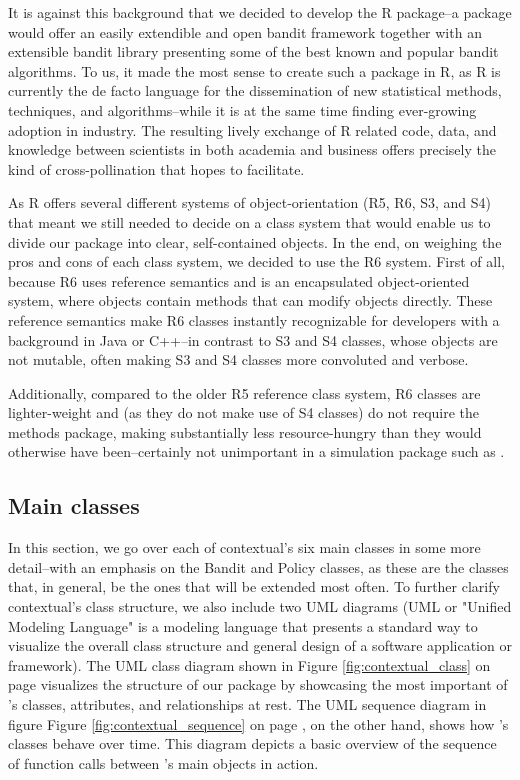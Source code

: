 \documentclass[nojss]{jss}\usepackage[]{graphicx}\usepackage[]{color}
\begin{document}
It is against this background that we decided to develop the  R package--a package would offer an easily extendible and open bandit framework together with an extensible bandit library presenting some of the best known and popular bandit algorithms. To us, it made the most sense to create such a package in R, as R is currently the de facto language for the dissemination of new statistical methods, techniques, and algorithms--while it is at the same time finding ever-growing adoption in industry. The resulting lively exchange of R related code, data, and knowledge between scientists in both academia and business offers precisely the kind of cross-pollination that  hopes to facilitate.

As R offers several different systems of object-orientation (R5, R6, S3, and S4) that meant we still needed to decide on a class system that would enable us to divide our package into clear, self-contained objects. In the end, on weighing the pros and cons of each class system, we decided to use the R6 system. First of all, because R6 uses reference semantics and is an encapsulated object-oriented system, where objects contain methods that can modify objects directly. These reference semantics make R6 classes instantly recognizable for developers with a background in Java or C++--in contrast to S3 and S4 classes, whose objects are not mutable, often making S3 and S4 classes more convoluted and verbose.

Additionally, compared to the older R5 reference class system, R6 classes are lighter-weight and (as they do not make use of S4 classes) do not require the methods package, making  substantially less resource-hungry than they would otherwise have been--certainly not unimportant in a simulation package such as .

\subsection{Main classes}

In this section, we go over each of contextual's six main classes in some more detail--with an emphasis on the Bandit and Policy classes, as these are the classes that, in general, be the ones that will be extended most often. To further clarify contextual's class structure, we also include two UML diagrams (UML or "Unified Modeling Language" is a modeling language that presents a standard way to visualize the overall class structure and general design of a software application or framework). The UML class diagram shown in Figure \ref{fig:contextual_class} on page \pageref{fig:contextual_class} visualizes the structure of our package by showcasing the most important of 's classes, attributes, and relationships at rest. The UML sequence diagram in figure Figure \ref{fig:contextual_sequence} on page \pageref{fig:contextual_sequence}, on the other hand, shows how 's classes behave over time. This diagram depicts a basic overview of the sequence of function calls between 's main objects in action.
\end{document}
